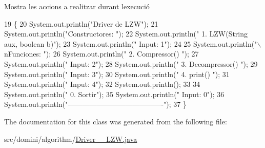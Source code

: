 Mostra les accions a realitzar durant l\textquotesingle{}execució 


\begin{DoxyCode}
19                                      \{
20         System.out.println(\textcolor{stringliteral}{"Driver de LZW"});
21         System.out.println(\textcolor{stringliteral}{"Constructores: "});
22         System.out.println(\textcolor{stringliteral}{"     1. LZW(String aux, boolean b)"});
23         System.out.println(\textcolor{stringliteral}{"     Input: 1"});
24 
25         System.out.println(\textcolor{stringliteral}{"\(\backslash\)nFunciones: "});
26         System.out.println(\textcolor{stringliteral}{"     2. Compressor() "});
27         System.out.println(\textcolor{stringliteral}{"     Input: 2"});
28         System.out.println(\textcolor{stringliteral}{"     3. Decompressor() "});
29         System.out.println(\textcolor{stringliteral}{"     Input: 3"});
30         System.out.println(\textcolor{stringliteral}{"     4. print() "});
31         System.out.println(\textcolor{stringliteral}{"     Input: 4"});
32         System.out.println();
33 
34         System.out.println(\textcolor{stringliteral}{"     0. Sortir"});
35         System.out.println(\textcolor{stringliteral}{"     Input: 0"});
36         System.out.println(\textcolor{stringliteral}{"----------------------------------------"});
37     \}
\end{DoxyCode}


The documentation for this class was generated from the following file\+:\begin{DoxyCompactItemize}
\item 
src/domini/algorithm/\hyperlink{Driver____LZW_8java}{Driver\+\_\+\+\_\+\+L\+Z\+W.\+java}\end{DoxyCompactItemize}
